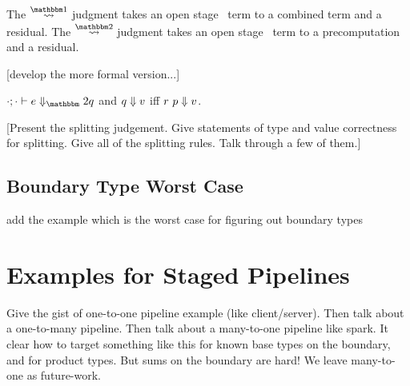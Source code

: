 The $\splitonesym$ judgment takes an open stage \bbone\ term to a combined term and a residual.
The $\splittwosym$ judgment takes an open stage \bbtwo\ term to a precomputation and a residual.

[develop the more formal version...]

  $\diatwo [\cdot;\cdot] e q$ and ${q} \Downarrow {v}$ iff ${r~p} \Downarrow {v}$.

[Present the splitting judgement.  Give statements of type and value correctness for splitting.  Give all of the splitting rules.  Talk through a few of them.]

\subsection {Boundary Type Worst Case}

\TODO add the example which is the worst case for figuring out boundary types




\section{Examples for Staged Pipelines}

Give the gist of one-to-one pipeline example (like client/server).
Then talk about a one-to-many pipeline.
Then talk about a many-to-one pipeline like spark.  It clear how to target something like this for known base types on the boundary, and for product types.  But sums on the boundary are hard!  We leave many-to-one as future-work.
